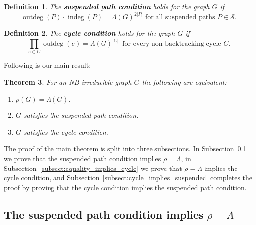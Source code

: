\documentclass{article}
\newtheorem{theorem}{Theorem}
\newtheorem{definition}[theorem]{Definition}
\DeclareMathOperator{\outdeg}{outdeg}
\DeclareMathOperator{\indeg}{indeg}
\begin{document}
\begin{definition}
    The {\bf suspended path condition} holds for the graph $G$ if
    \begin{equation}\label{eq:2-pathcond}
        \outdeg(P) \cdot \indeg(P) = {\Lambda(G)}^{2|P|} \mbox{ for all suspended paths } P \in \mathcal{S}.
    \end{equation}
\end{definition}

\begin{definition}
    The {\bf cycle condition} holds for the graph $G$ if 
    \begin{equation}
        \prod_{e \in C} \outdeg(e) = \Lambda(G)^{|C|} \, \mbox{ for every non-backtracking cycle } C.\label{eq:cyclecond}
    \end{equation}    
\end{definition}

\noindent
Following is our main result:

\begin{theorem}\label{theorem:main}
    For an NB-irreducible graph $G$ 
    the following are equivalent:
    \begin{enumerate}
        \item $\rho(G) = \Lambda(G)$. \label{theorem:main_rho=Lambda}
        \item $G$ satisfies the suspended path condition.\label{theorem:main_path}
        \item $G$ satisfies the cycle condition.\label{theorem:main_cycle}
    \end{enumerate}
\end{theorem}

The proof of the main theorem is split into three subsections. 
In Subsection~\ref{subsect:suspended_implies_equality} we prove that the suspended path condition implies $\rho = \Lambda$,
in Subsection~\ref{subsect:equality_implies_cycle} we prove that $\rho = \Lambda$ implies the cycle condition,
and Subsection~\ref{subsect:cycle_implies_suspended} completes the proof by proving that the cycle condition implies the suspended path condition.

\subsection{The suspended path condition implies $\rho = \Lambda$}\label{subsect:suspended_implies_equality}
\end{document}
